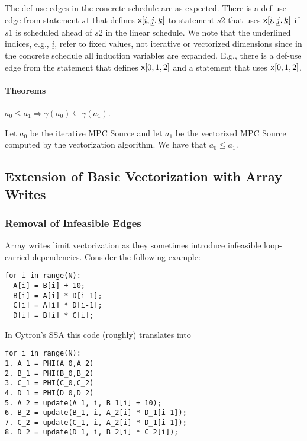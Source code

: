  The def-use edges in the concrete schedule are as expected. There is a def use edge from statement $s1$ that defines ${\sf {x}}[\underline{i},\underline{j},\underline{k}]$
 to statement $s2$ that uses ${\sf {x}}[\underline{i},\underline{j},\underline{k}]$ if $s1$ is scheduled ahead of $s2$ in the linear schedule. We note that the underlined
 indices, e.g., $\underline{i}$, refer to fixed values, not iterative or vectorized dimensions since in the concrete schedule all induction variables are expanded.
 E.g., there is a def-use edge from the statement that defines ${\sf {x}}[0,1,2]$ and a statement that uses ${\sf {x}}[0,1,2]$.

\paragraph{Theorems}

\begin{theorem} $a_0 \le a_1 \Rightarrow \gamma(a_0) \subseteq \gamma(a_1)$.
\end{theorem}

\begin{theorem} Let $a_0$ be the iterative MPC Source and let $a_1$ be the vectorized MPC Source computed by the vectorization algorithm.
We have that $a_0 \le a_1$.
\end{theorem}


\subsection{Extension of Basic Vectorization with Array Writes}

\subsubsection{Removal of Infeasible Edges}

Array writes limit vectorization as they sometimes introduce infeasible loop-carried dependencies. Consider the following example: 

{\small
\begin{verbatim}
for i in range(N):
  A[i] = B[i] + 10;
  B[i] = A[i] * D[i-1];
  C[i] = A[i] * D[i-1];
  D[i] = B[i] * C[i];
\end{verbatim}
}

In Cytron's SSA this code (roughly) translates into

{\small
\begin{verbatim}
for i in range(N):
1. A_1 = PHI(A_0,A_2)
2. B_1 = PHI(B_0,B_2)
3. C_1 = PHI(C_0,C_2)
4. D_1 = PHI(D_0,D_2)
5. A_2 = update(A_1, i, B_1[i] + 10);
6. B_2 = update(B_1, i, A_2[i] * D_1[i-1]);
7. C_2 = update(C_1, i, A_2[i] * D_1[i-1]);
8. D_2 = update(D_1, i, B_2[i] * C_2[i]);
\end{verbatim}
}

